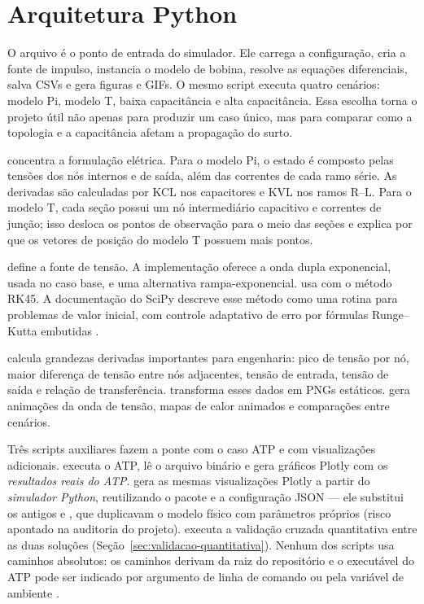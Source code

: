 \section{Arquitetura Python}

O arquivo  é o ponto de entrada do simulador. Ele carrega a configuração, cria a fonte de impulso, instancia o modelo de bobina, resolve as equações diferenciais, salva CSVs e gera figuras e GIFs. O mesmo script executa quatro cenários: modelo Pi, modelo T, baixa capacitância e alta capacitância. Essa escolha torna o projeto útil não apenas para produzir um caso único, mas para comparar como a topologia e a capacitância afetam a propagação do surto.

 concentra a formulação elétrica. Para o modelo Pi, o estado é composto pelas tensões dos nós internos e de saída, além das correntes de cada ramo série. As derivadas são calculadas por KCL nos capacitores e KVL nos ramos R--L. Para o modelo T, cada seção possui um nó intermediário capacitivo e correntes de junção; isso desloca os pontos de observação para o meio das seções e explica por que os vetores de posição do modelo T possuem mais pontos.

 define a fonte de tensão. A implementação oferece a onda dupla exponencial, usada no caso base, e uma alternativa rampa-exponencial.  usa  com o método RK45. A documentação do SciPy descreve esse método como uma rotina para problemas de valor inicial, com controle adaptativo de erro por fórmulas Runge--Kutta embutidas \cite{scipy_solve_ivp}.

 calcula grandezas derivadas importantes para engenharia: pico de tensão por nó, maior diferença de tensão entre nós adjacentes, tensão de entrada, tensão de saída e relação de transferência.  transforma esses dados em PNGs estáticos.  gera animações da onda de tensão, mapas de calor animados e comparações entre cenários.

Três scripts auxiliares fazem a ponte com o caso ATP e com visualizações adicionais.  executa o ATP, lê o arquivo binário  e gera gráficos Plotly com os \emph{resultados reais do ATP}.  gera as mesmas visualizações Plotly a partir do \emph{simulador Python}, reutilizando o pacote  e a configuração JSON — ele substitui os antigos  e , que duplicavam o modelo físico com parâmetros próprios (risco apontado na auditoria do projeto).  executa a validação cruzada quantitativa entre as duas soluções (Seção~\ref{sec:validacao-quantitativa}). Nenhum dos scripts usa caminhos absolutos: os caminhos derivam da raiz do repositório e o executável do ATP pode ser indicado por argumento de linha de comando ou pela variável de ambiente .

